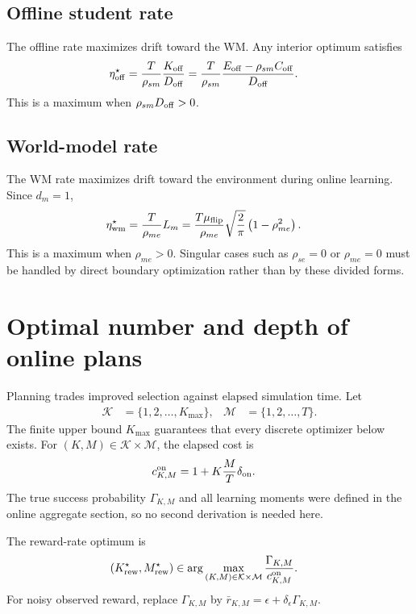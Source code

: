 \documentclass{article}
\begin{document}
\subsection{Offline student rate}

The offline rate maximizes drift toward the WM. Any interior optimum satisfies
\begin{align}
\eta_{\rm off}^\star &= \frac{T}{\rho_{sm}}\frac{K_{\rm off}}{D_{\rm off}}=\frac{T}{\rho_{sm}}\frac{E_{\rm off}-\rho_{sm}C_{\rm off}}{D_{\rm off}}.
\end{align}
This is a maximum when $\rho_{sm}D_{\rm off}>0$.

\subsection{World-model rate}

The WM rate maximizes drift toward the environment during online learning. Since $d_m=1$,
\begin{align}
\eta_{\rm wm}^\star &= \frac{T}{\rho_{me}}L_m=\frac{T\mu_{\rm flip}}{\rho_{me}}\sqrt{\frac{2}{\pi}}\left(1-\rho_{me}^2\right).
\end{align}
This is a maximum when $\rho_{me}>0$. Singular cases such as $\rho_{se}=0$ or $\rho_{me}=0$ must be handled by direct boundary optimization rather than by these divided forms.

\section{Optimal number and depth of online plans}

Planning trades improved selection against elapsed simulation time. Let
\begin{align}
\mathcal K &= \{1,2,\ldots,K_{\max}\}, & \mathcal M &= \{1,2,\ldots,T\}.
\end{align}
The finite upper bound $K_{\max}$ guarantees that every discrete optimizer below exists. For $(K,M)\in\mathcal K\times\mathcal M$, the elapsed cost is
\begin{align}
c_{K,M}^{\rm on} &= 1+K\frac{M}{T}\delta_{\rm on}.
\end{align}
The true success probability $\Gamma_{K,M}$ and all learning moments were defined in the online aggregate section, so no second derivation is needed here.

The reward-rate optimum is
\begin{align}
(K_{\rm rew}^\star,M_{\rm rew}^\star) &\in \arg\max_{(K,M)\in\mathcal K\times\mathcal M}\frac{\Gamma_{K,M}}{c_{K,M}^{\rm on}}.
\end{align}
For noisy observed reward, replace $\Gamma_{K,M}$ by $\bar r_{K,M}=\epsilon+\delta_\epsilon\Gamma_{K,M}$.
\end{document}
